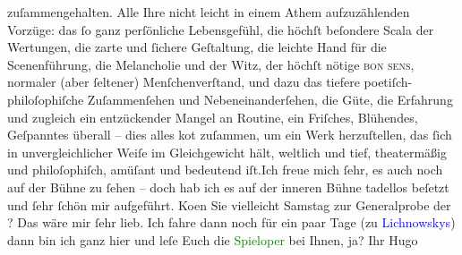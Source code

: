               zuſammengehalten. Alle Ihre nicht leicht in einem Athem aufzuzählenden Vorzüge: das
               ſo ganz perſönliche Lebensgefühl, die höchſt beſondere Scala der Wertungen, {\pb}die zarte und ſichere Geſtaltung,
               die leichte Hand für die Scenenführung, die Melancholie und der Witz, der höchſt
               nötige \textsc{bon sens}, normaler (aber ſeltener) Menſchenverſtand,
               und dazu das tiefere poetiſch-philoſophiſche Zuſammenſehen und Nebeneinanderſehen,
               die Güte, die Erfahrung und zugleich ein entzückender Mangel an Routine, ein
               Friſches, Blühendes, Geſpanntes überall – dies alles ko{\geminationm}t zuſammen, um ein {\pb}Werk
               herzuſtellen, das ſich in unvergleichlicher Weiſe im Gleichgewicht hält, weltlich und
               tief, theatermäßig und philoſophiſch, amüſant und bedeutend iſt.\hspace*{1.5em}Ich freue mich ſehr, es auch noch auf der Bühne zu ſehen – doch hab
               ich es auf der inneren Bühne tadellos beſetzt und ſehr ſchön mir aufgeführt.\pend
           \pstart
           Ko{\geminationm}en Sie vielleicht Samstag zur
               Generalprobe der \label{K_L01968_2v}\label{K_L01968_2h}? Das wäre mir ſehr lieb.
               Ich fahre dann noch für ein paar Tage \label{K_L01968_3v}\label{K_L01968_3h} (zu \textcolor{blue}{Lichnowskys}{}\ledrightnote{\textcolor{blue}{Karl Max Lichnowsky}{\newline}\textcolor{blue}{Mechtilde Lichnowsky}}) dann bin ich ganz hier und leſe Euch die \textcolor{green}{Spieloper}{} bei Ihnen, ja?\pend
           \pstart Ihr \spacefill\mbox{Hugo}\pend{}\pstart
           \label{T_L01968_1v}\label{T_L01968_1h}\pend
           \endnumbering{}  
      